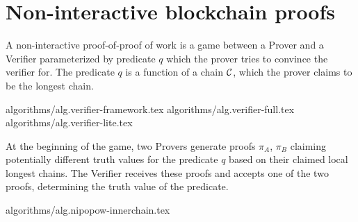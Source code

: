 \section{Non-interactive blockchain proofs}

A non-interactive proof-of-proof of work is a game between a Prover and a
Verifier parameterized by predicate $q$ which the prover tries to convince the
verifier for. The predicate $q$ is a function of a chain $\mathcal{C}$, which the
prover claims to be the longest chain.

{algorithms/alg.verifier-framework.tex}
{algorithms/alg.verifier-full.tex}
{algorithms/alg.verifier-lite.tex}

At the beginning of the game, two Provers generate proofs $\pi_A$, $\pi_B$
claiming potentially different truth values for the predicate $q$ based on
their claimed local longest chains. The Verifier receives these proofs and
accepts one of the two proofs, determining the truth value of the predicate.

{algorithms/alg.nipopow-innerchain.tex}
